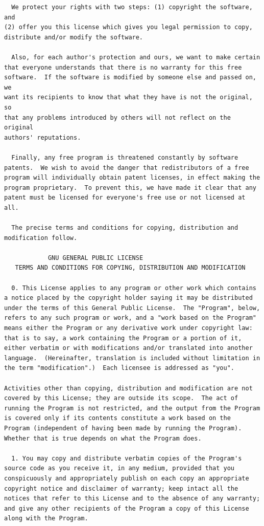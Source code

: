 \documentclass[mingoth,a4paper]{jsarticle}
\begin{document}
{{{{{{{{{\begin{multicols}{2}
\begin{fontsize}{6}{6}
\begin{verbatim}
  We protect your rights with two steps: (1) copyright the software, and
(2) offer you this license which gives you legal permission to copy,
distribute and/or modify the software.

  Also, for each author's protection and ours, we want to make certain
that everyone understands that there is no warranty for this free
software.  If the software is modified by someone else and passed on, we
want its recipients to know that what they have is not the original, so
that any problems introduced by others will not reflect on the original
authors' reputations.

  Finally, any free program is threatened constantly by software
patents.  We wish to avoid the danger that redistributors of a free
program will individually obtain patent licenses, in effect making the
program proprietary.  To prevent this, we have made it clear that any
patent must be licensed for everyone's free use or not licensed at all.

  The precise terms and conditions for copying, distribution and
modification follow.

            GNU GENERAL PUBLIC LICENSE
   TERMS AND CONDITIONS FOR COPYING, DISTRIBUTION AND MODIFICATION

  0. This License applies to any program or other work which contains
a notice placed by the copyright holder saying it may be distributed
under the terms of this General Public License.  The "Program", below,
refers to any such program or work, and a "work based on the Program"
means either the Program or any derivative work under copyright law:
that is to say, a work containing the Program or a portion of it,
either verbatim or with modifications and/or translated into another
language.  (Hereinafter, translation is included without limitation in
the term "modification".)  Each licensee is addressed as "you".

Activities other than copying, distribution and modification are not
covered by this License; they are outside its scope.  The act of
running the Program is not restricted, and the output from the Program
is covered only if its contents constitute a work based on the
Program (independent of having been made by running the Program).
Whether that is true depends on what the Program does.

  1. You may copy and distribute verbatim copies of the Program's
source code as you receive it, in any medium, provided that you
conspicuously and appropriately publish on each copy an appropriate
copyright notice and disclaimer of warranty; keep intact all the
notices that refer to this License and to the absence of any warranty;
and give any other recipients of the Program a copy of this License
along with the Program.


\end{verbatim}
\end{fontsize}
\end{multicols}}}}}}}}}}
\end{document}
